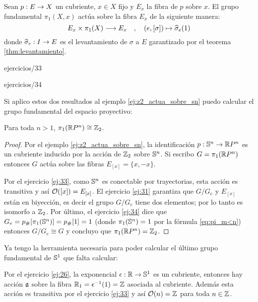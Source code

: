 \documentclass[../../topologia_algebraica]{subfiles}
\begin{document}
\begin{defin}
  Sean $p:E\rightarrow X$ un cubriente, $x\in X$ fijo y $E_x$ la fibra de $p$ sobre $x$. El grupo
  fundamental $\pi_1(X,x)$ act\'ua  sobre la fibra $E_x$ de la siguiente manera:
  \[
    E_x \times \pi_1(X) \longrightarrow E_x \quad ,\quad (e,[\sigma]) \mapsto \widehat{ \sigma }_e(1)
  \]
  donde $\widehat{ \sigma }_e:I\rightarrow E$ es el levantamiento de $\sigma$ a $E$ garantizado por el
  teorema \ref{thm:levantamiento}.
\end{defin}


{ejercicios/33} %

{ejercicios/34} %

Si aplico estos dos resultados al ejemplo \ref{ej:z2_actua_sobre_sn} puedo calcular el grupo
fundamental del espacio proyectivo:

\begin{prop}
  Para toda $n>1$, $\pi_1(\mathbb{R} P^n)\cong \mathbb{Z}_2$.
\end{prop}
\begin{proof}
  Por el ejemplo \ref{ej:z2_actua_sobre_sn}, la identificaci\'on $p:\mathbb{S}^n\rightarrow\mathbb{R} P^n$ es un
  cubriente inducido por la acci\'on de $\mathbb{Z}_2$ sobre $\mathbb{S}^n$. Si escribo $G=\pi_1(\mathbb{R} P^n)$
  entonces $G$ act\'ua sobre las fibras $E_{[x]}=\{x,-x\}$.

  Por el ejercicio \ref{ej:33},
  como $\mathbb{S}^n$ es conectable por trayectorias, esta acci\'on es transitiva y as\'i
  $\mathcal{O}([x])=E_{[x]}$. El ejercicio \ref{ej:31} garantiza que $G/G_e$ y $E_{[x]}$ est\'an en
  biyecci\'on, es decir el grupo $G/G_e$ tiene dos elementos; por lo tanto es isomorfo a $\mathbb{Z}_2$.
  Por \'ultimo, el ejercicio \ref{ej:34} dice que $G_e=p_{\#}[\pi_1(\mathbb{S}^n)]=p_{\#}[1]=1$ (donde
  $\pi_1(\mathbb{S}^n)=1$ por la f\'ormula \ref{eq:pi_m<n}) entonces $G/G_e\cong G$ y concluyo que
  $\pi_1(\mathbb{R} P^n)=\mathbb{Z}_2$.  
\end{proof}

Ya tengo la herramienta necesaria para poder calcular el \'ultimo grupo fundamental de $\mathbb{S}^1$ que
falta calcular:

Por el ejercicio \ref{ej:26}, la exponencial $\epsilon:\mathbb{R}\rightarrow\mathbb{S}^1$ es un cubriente, entonces
hay acci\'on $\mathfrak{a}$ sobre la fibra $\mathbb{R}_1=\epsilon^{-1}(1)=\mathbb{Z}$ asociada al cubriente. Adem\'as esta
acci\'on es transitiva por el ejercicio \ref{ej:33} y as\'i $\mathcal{O}(n)=\mathbb{Z}$ para toda $n\in\mathbb{Z}$.
  
\end{document}
